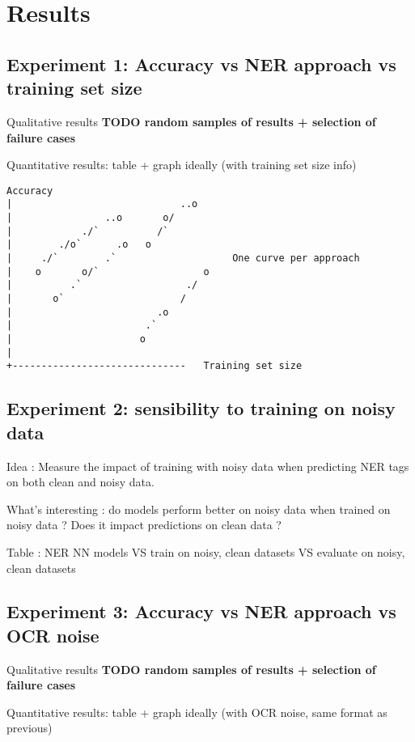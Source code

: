 \section{Results}

\subsection{Experiment 1: Accuracy vs NER approach vs training set size}

Qualitative results
\textbf{TODO random samples of results + selection of failure cases}


Quantitative results: table + graph ideally (with training set size info)


\begin{verbatim}
Accuracy
|                             ..o   
|                ..o       o/       
|            ./`          /`          
|        ./o`      .o   o            
|     ./`        .`                    One curve per approach
|    o       o/`                  o  
|          .`                  ./    
|       o`                    /      
|                         .o        
|                       .`           
|                      o            
|                                   
+------------------------------   Training set size
\end{verbatim}
                                        

\subsection{Experiment 2: sensibility to training on noisy data}
Idea : Measure the impact of training with noisy data when predicting NER tags on both clean and noisy data.

What's interesting : do models perform better on noisy data when trained on noisy data ? Does it impact predictions on clean data ?

Table : NER NN models VS train on {noisy, clean} datasets VS evaluate on {noisy, clean} datasets


\subsection{Experiment 3: Accuracy vs NER approach vs OCR noise}

Qualitative results
\textbf{TODO random samples of results + selection of failure cases}

Quantitative results: table + graph ideally (with OCR noise, same format as previous)

